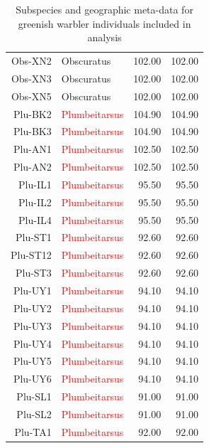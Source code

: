 \documentclass[10pt,letterpaper]{article}
\begin{document}
\begin{table}
\begin{tabular}{rlrr}
   Obs-XN2 & \textcolor{BurntOrange}{Obscuratus} & 102.00 & 102.00 \\ 
   Obs-XN3 & \textcolor{BurntOrange}{Obscuratus} & 102.00 & 102.00 \\ 
   Obs-XN5 & \textcolor{BurntOrange}{Obscuratus} & 102.00 & 102.00 \\ 
      \hline
   Plu-BK2 & \textcolor{red}{Plumbeitarsus} & 104.90 & 104.90 \\ 
   Plu-BK3 & \textcolor{red}{Plumbeitarsus} & 104.90 & 104.90 \\ 
   Plu-AN1 & \textcolor{red}{Plumbeitarsus} & 102.50 & 102.50 \\ 
   Plu-AN2  & \textcolor{red}{Plumbeitarsus} & 102.50 & 102.50 \\ 
   Plu-IL1 & \textcolor{red}{Plumbeitarsus} & 95.50 & 95.50 \\ 
   Plu-IL2 & \textcolor{red}{Plumbeitarsus} & 95.50 & 95.50 \\ 
   Plu-IL4 & \textcolor{red}{Plumbeitarsus} & 95.50 & 95.50 \\ 
   Plu-ST1 & \textcolor{red}{Plumbeitarsus} & 92.60 & 92.60 \\ 
   Plu-ST12 & \textcolor{red}{Plumbeitarsus} & 92.60 & 92.60 \\ 
   Plu-ST3 & \textcolor{red}{Plumbeitarsus} & 92.60 & 92.60 \\ 
   Plu-UY1 & \textcolor{red}{Plumbeitarsus} & 94.10 & 94.10 \\ 
   Plu-UY2 & \textcolor{red}{Plumbeitarsus} & 94.10 & 94.10 \\ 
   Plu-UY3 & \textcolor{red}{Plumbeitarsus} & 94.10 & 94.10 \\ 
   Plu-UY4 & \textcolor{red}{Plumbeitarsus} & 94.10 & 94.10 \\ 
   Plu-UY5 & \textcolor{red}{Plumbeitarsus} & 94.10 & 94.10 \\ 
   Plu-UY6 & \textcolor{red}{Plumbeitarsus} & 94.10 & 94.10 \\ 
   Plu-SL1 & \textcolor{red}{Plumbeitarsus} & 91.00 & 91.00 \\ 
   Plu-SL2 & \textcolor{red}{Plumbeitarsus} & 91.00 & 91.00 \\ 
   Plu-TA1 & \textcolor{red}{Plumbeitarsus} & 92.00 & 92.00 \\ 
   \hline
   \end{tabular}
   \caption{Subspecies and geographic meta-data for greenish warbler individuals included in analysis}
   \label{tab:warbler_data_table}
\end{table}
\end{document}
